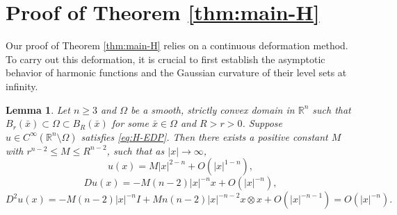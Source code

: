 \documentclass[reqno]{amsart}
\newtheorem{lemma}[theorem]{Lemma}
\theoremstyle{remark}
\theoremstyle{definition}
\numberwithin{equation}{section}
\begin{document}
\section{Proof of Theorem \ref{thm:main-H}}\label{sec:convexity-H}
 Our proof of Theorem \ref{thm:main-H} relies on a continuous deformation method. To carry out this deformation, it is crucial to first establish the asymptotic behavior of harmonic functions and the Gaussian curvature of their level sets at infinity. 

\begin{lemma}\label{lem:H-asy}
	Let $n\geq3$ and $\Omega$ be a smooth, strictly convex domain in $\mathbb{R}^n$ such that $B_r(\bar{x})\subset\Omega\subset B_R(\bar{x})$ for some $\bar{x} \in \Omega$ and $R > r > 0$. Suppose $u\in C^\infty(\mathbb{R}^n\setminus\Omega)$ satisfies \eqref{eq:H-EDP}.
	Then there exists a positive constant $M$ with $r^{n-2}\leq M\leq R^{n-2}$, such that as $|x|\to\infty$,
	$$u(x)=M|x|^{2-n}+O(|x|^{1-n}),$$
	$$Du(x)=-M(n-2)|x|^{-n}x+O(|x|^{-n}),$$
	$$D^2 u(x) = -M(n-2)|x|^{-n} I + Mn(n-2)|x|^{-n-2} x \otimes x + O(|x|^{-n-1})=O(|x|^{-n}).$$
\end{lemma}
\end{document}
